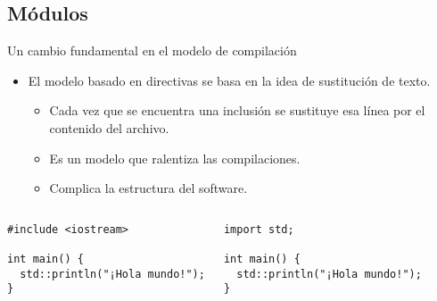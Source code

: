 \subsection{Módulos}

\begin{frame}[t,fragile]{Un cambio fundamental en el modelo de compilación}
\begin{itemize}
  \item El modelo basado en directivas  se basa en la
        idea de sustitución de texto.
    \begin{itemize}
      \item Cada vez que se encuentra una inclusión se sustituye esa línea
            por el contenido del archivo.
      \item Es un modelo que ralentiza las compilaciones.
      \item Complica la estructura del software.
    \end{itemize}
\end{itemize}

\begin{columns}[T]

\begin{lstlisting}
#include <iostream>

int main() {
  std::println("¡Hola mundo!");
}
\end{lstlisting}

\pause
{}
\begin{lstlisting}
import std;

int main() {
  std::println("¡Hola mundo!");
}
\end{lstlisting}

\end{columns}
\end{frame}

